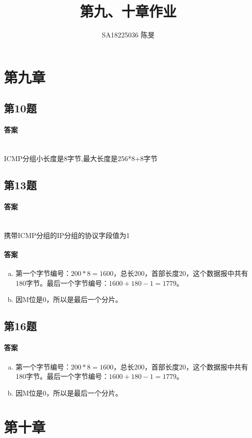 \documentclass[UTF8]{article}
\title{第九、十章作业}
\author{SA18225036 陈旻}
\begin{document}
\date{}
\maketitle
\section{第九章}
\subsection{第10题}
\paragraph{答案}
~\\
ICMP分组小长度是8字节,最大长度是256*8+8字节 
\subsection{第13题}
\paragraph{答案}
~\\
携带ICMP分组的IP分组的协议字段值为1 
\paragraph{答案}
\begin{enumerate}[a.]
    \item 第一个字节编号：$ 200*8=1600 $，总长200，首部长度20，这个数据报中共有180字节。最后一个字节编号：$ 1600+180-1=1779 $。
    \item 因M位是0，所以是最后一个分片。
\end{enumerate}
\subsection{第16题}
\paragraph{答案}
\begin{enumerate}[a.]
    \item 第一个字节编号：$ 200*8=1600 $，总长200，首部长度20，这个数据报中共有180字节。最后一个字节编号：$ 1600+180-1=1779 $。
    \item 因M位是0，所以是最后一个分片。
\end{enumerate}
\section{第十章}
\end{document}
